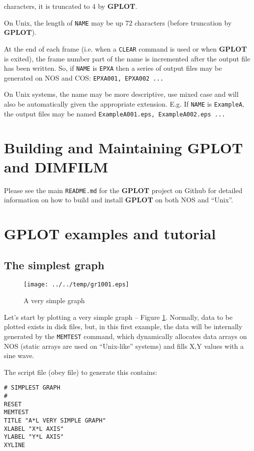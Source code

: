 \documentclass[a4paper,twoside,11pt]{article}
\makeatletter
\def\maxwidth{%
  \ifdim\Gin@nat@width>\linewidth
    \linewidth
  \else
    \Gin@nat@width
  \fi
}
\newcommand{\newpara}{\par\vspace{4mm}\noindent}
\makeatother
\begin{document}
characters, it is truncated to 4 by \textbf{GPLOT}.
\newpara
On Unix, the length of \texttt{NAME} may be up 72 characters (before truncation by \textbf{GPLOT}). 
\newpara
At the end of each frame (i.e. when a \texttt{CLEAR} command is used or when \textbf{GPLOT} is exited), the frame number part
of the name is incremented after the output file has been written. So, if \texttt{NAME} is \texttt{EPXA} then a series of
output files may be generated on NOS and COS: \texttt{EPXA001, EPXA002 ...}
\newpara
On Unix systems, the name may be more descriptive, use mixed case and will also be automatically given the 
appropriate extension. E.g. If \texttt{NAME} is \texttt{ExampleA}, the output files may be named
\texttt{ExampleA001.eps, ExampleA002.eps ...}

\section{Building and Maintaining \textbf{GPLOT} and DIMFILM}

Please see the main \texttt{README.md} for the \textbf{GPLOT} project on Github
for detailed information on how to build and install \textbf{GPLOT} on both NOS
and ``Unix''.

\section{GPLOT examples and tutorial}

\subsection{The simplest graph}

\begin{figure}
  \centering
  \texttt{[image: ../../temp/gr1001.eps]}
  \caption{A very simple graph}
  \label{fig:gr1001}
\end{figure}

Let's start by plotting a very simple graph -- Figure \ref{fig:gr1001}.
Normally, data to be
plotted exists in disk files, but, in this first example, the data
will be internally generated by the \texttt{MEMTEST} command, which dynamically
allocates data arrays on NOS (static arrays are used on ``Unix-like'' systems)
and fills X,Y values with a sine wave.

\newpara
The script file (obey file) to generate this contains:
\begin{lstlisting}
# SIMPLEST GRAPH
#
RESET
MEMTEST
TITLE "A*L VERY SIMPLE GRAPH"
XLABEL "X*L AXIS"
YLABEL "Y*L AXIS"
XYLINE
\end{lstlisting}
\end{document}
